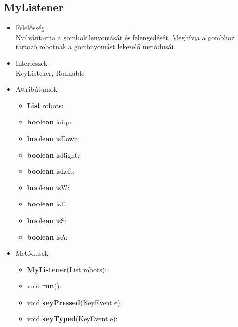 \subsection{MyListener}
\begin{itemize}
\item Felelősség\\
Nyilvántartja a gombok lenyomását és felengedését. Meghívja a gombhoz tartozó robotnak a gombnyomást lekezelő metódusát.
\item Interfészek\\
KeyListener, Runnable
\item Attribútumok
	\begin{itemize}
	    \item \textbf{List} robots: 
		\item \textbf{boolean} isUp: 
		\item \textbf{boolean} isDown: 
		\item \textbf{boolean} isRight: 
		\item \textbf{boolean} isLeft: 
		\item \textbf{boolean} isW: 
		\item \textbf{boolean} isD: 
		\item \textbf{boolean} isS: 
		\item \textbf{boolean} isA: 
	\end{itemize}
\item Metódusok
	\begin{itemize}
		\item \textbf{MyListener}(List robots): 
		\item void \textbf{run}():  
		\item void \textbf{keyPressed}(KeyEvent e): 
		\item void \textbf{keyTyped}(KeyEvent e): 
	\end{itemize}
\end{itemize}

